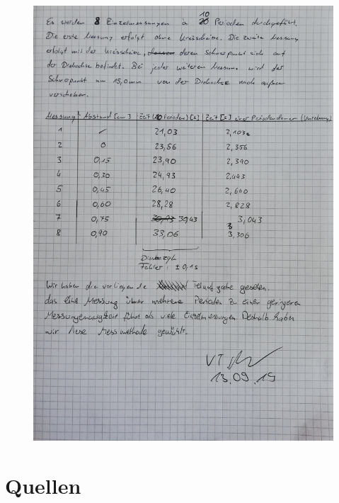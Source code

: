 \documentclass[11pt,a4paper]{article}
\begin{document}
\begin{figure}[H]
	\includegraphics[width=1\linewidth]{S3.jpg}
	\centering
\end{figure}
\newpage
\section{Quellen}
%


%
\end{document}
